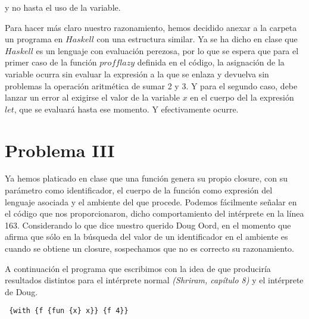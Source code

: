 \documentclass[12pt]{article}
\begin{document}
y no hasta el uso de la variable.\par
Para hacer más claro nuestro razonamiento, hemos decidido anexar a la carpeta un programa en $Haskell$ con una estructura similar.
Ya se ha dicho en clase que $Haskell$ es un lenguaje con evaluación perezosa, por lo que se espera que para el primer caso de la función $profflazy$
definida en el código, la asignación de la variable ocurra sin evaluar la expresión a la que se enlaza y devuelva sin problemas la operación
aritmética de sumar 2 y 3. Y para
el segundo caso, debe lanzar un error al exigirse el valor de la variable $x$ en el cuerpo del la expresión $let$, que se evaluará hasta ese momento.
Y efectivamente ocurre. 

\section*{Problema III}
Ya hemos platicado en clase que una función genera su propio
closure, con su parámetro como identificador, el cuerpo de la función como expresión del lenguaje asociada y el ambiente del que procede.
Podemos fácilmente señalar en el código que nos proporcionaron, dicho comportamiento del intérprete en la línea 163.
Considerando lo que dice nuestro querido Doug Oord, en el momento que afirma que sólo en la búsqueda del valor de un identificador en el ambiente
es cuando se obtiene un closure, sospechamos que no es correcto su razonamiento. \par
A continuación el programa que escribimos con la idea de que produciría resultados distintos para el intérprete normal
\textit{(Shriram, capítulo 8)} y el intérprete de Doug. \par
\begin{verbatim}
 {with {f {fun {x} x}} {f 4}}
\end{verbatim}
\par
\end{document}
